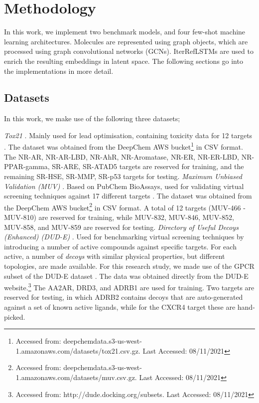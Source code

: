 \section{Methodology}

In this work, we implement two benchmark models, and four few-shot machine learning architectures. Molecules are represented using graph objects, which are processed using graph convolutional networks (GCNs). IterRefLSTMs are used to enrich the resulting embeddings in latent space. The following sections go into the implementations in more detail.

\subsection{Datasets}

In this work, we make use of the following three datasets;

\textit{Tox21} \cite{huang2016tox21challenge}. Mainly used for lead optimisation, containing toxicity data for 12 targets \citep{tox21}. The dataset was obtained from the DeepChem AWS bucket\footnote{Accessed from: deepchemdata.s3-us-west-1.amazonaws.com/datasets/tox21.csv.gz. Last Accessed: 08/11/2021} in CSV format. The NR-AR, NR-AR-LBD, NR-AhR, NR-Aromatase, NR-ER, NR-ER-LBD, NR-PPAR-gamma, SR-ARE, SR-ATAD5 targets are reserved for training, and the remaining SR-HSE, SR-MMP, SR-p53 targets for testing.
\textit{Maximum Unbiased Validation (MUV)} \citep{rohrer2009maximum}. Based on PubChem BioAssays, used for validating virtual screening techniques against 17 different targets \citep{rohrer2009maximum}. The dataset was obtained from the DeepChem AWS bucket\footnote{Accessed from: deepchemdata.s3-us-west-1.amazonaws.com/datasets/muv.csv.gz. Last Accessed: 08/11/2021} in CSV format. A total of 12 targets (MUV-466 - MUV-810) are reserved for training, while MUV-832, MUV-846, MUV-852, MUV-858, and MUV-859 are reserved for testing.
\textit{Directory of Useful Decoys (Enhanced) (DUD-E)} \cite{mysinger2012directory}. Used for benchmarking virtual screening techniques by introducing a number of active compounds against specific targets. For each active, a number of \textit{decoys} with similar physical properties, but different topologies, are made available. For this research study, we made use of the GPCR subset of the DUD-E dataset \citep{mysinger2012directory}. The data was obtained directly from the DUD-E website.\footnote{Accessed from: http://dude.docking.org/subsets. Last Accessed: 08/11/2021} The AA2AR, DRD3, and ADRB1 are used for training. Two targets are reserved for testing, in which ADRB2 contains decoys that are auto-generated against a set of known active ligands, while for the CXCR4 target these are hand-picked. 

